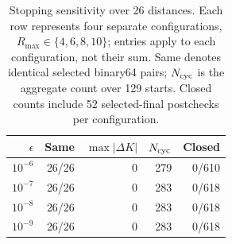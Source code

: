 \begin{table}[t]
 \centering\small
 \caption{Stopping sensitivity over 26 distances. Each row represents four
 separate configurations, $R_{\max}\in\{4,6,8,10\}$; entries apply to each
 configuration, not their sum. Same denotes identical selected binary64 pairs;
 $N_{\rm cyc}$ is the aggregate count over 129 starts. Closed counts include
 52 selected-final postchecks per configuration.}
 \label{tab:ao-stopping-sensitivity}
 \begin{tabular}{rrrrr}
 \hline
 $\epsilon$ & Same & $\max|\Delta K|$ & $N_{\rm cyc}$ & Closed \\
 \hline
 $10^{-6}$ & 26/26 & 0 & 279 & 0/610 \\
 $10^{-7}$ & 26/26 & 0 & 283 & 0/618 \\
 $10^{-8}$ & 26/26 & 0 & 283 & 0/618 \\
 $10^{-9}$ & 26/26 & 0 & 283 & 0/618 \\
 \hline
 \end{tabular}
\end{table}
